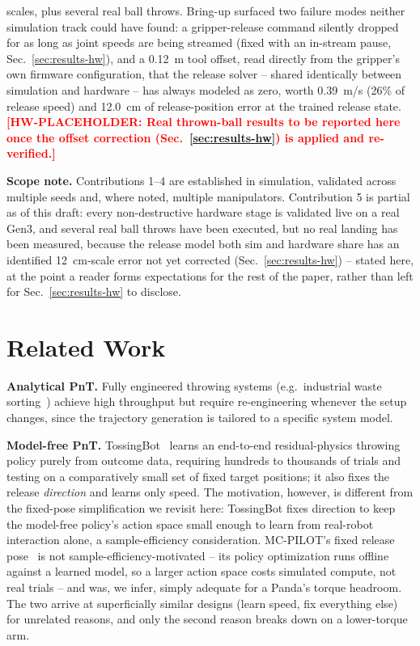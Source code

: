 \documentclass[conference]{IEEEtran}
\newcommand{\hwtodo}[1]{\textcolor{red}{\textbf{[HW-PLACEHOLDER: #1]}}}
\begin{document}
\begin{enumerate}
scales, plus several real ball throws. Bring-up surfaced two failure modes
neither simulation track could have found: a gripper-release command
silently dropped for as long as joint speeds are being streamed (fixed with
an in-stream pause, Sec.~\ref{sec:results-hw}), and a 0.12~m tool offset,
read directly from the gripper's own firmware configuration, that the
release solver -- shared identically between simulation and hardware -- has
always modeled as zero, worth 0.39~m/s (26\% of release speed) and 12.0~cm
of release-position error at the trained release state.
\hwtodo{Real thrown-ball results to be reported here once the offset
correction (Sec.~\ref{sec:results-hw}) is applied and re-verified.}
\end{enumerate}

\textbf{Scope note.} Contributions 1--4 are established in simulation,
validated across multiple seeds and, where noted, multiple manipulators.
Contribution 5 is partial as of this draft: every non-destructive hardware
stage is validated live on a real Gen3, and several real ball throws have
been executed, but no real landing has been measured, because the release
model both sim and hardware share has an identified 12~cm-scale error not
yet corrected (Sec.~\ref{sec:results-hw}) -- stated here, at the point a
reader forms expectations for the rest of the paper, rather than left for
Sec.~\ref{sec:results-hw} to disclose.

\section{Related Work}

\textbf{Analytical PnT.} Fully engineered throwing systems
(e.g.\ industrial waste sorting~\cite{turcato2025mcpilot}) achieve high
throughput but require re-engineering whenever the setup changes, since the
trajectory generation is tailored to a specific system model.

\textbf{Model-free PnT.} TossingBot~\cite{zeng2020tossingbot} learns an
end-to-end residual-physics throwing policy purely from outcome data,
requiring hundreds to thousands of trials and testing on a comparatively
small set of fixed target positions; it also fixes the release
\emph{direction} and learns only speed. The motivation, however, is
different from the fixed-pose simplification we revisit here: TossingBot
fixes direction to keep the model-free policy's action space small enough
to learn from real-robot interaction alone, a sample-efficiency
consideration. MC-PILOT's fixed release pose~\cite{turcato2025mcpilot} is
not sample-efficiency-motivated -- its policy optimization runs offline
against a learned model, so a larger action space costs simulated compute,
not real trials -- and was, we infer, simply adequate for a Panda's torque
headroom. The two arrive at superficially similar designs (learn speed,
fix everything else) for unrelated reasons, and only the second reason
breaks down on a lower-torque arm.
\end{document}

